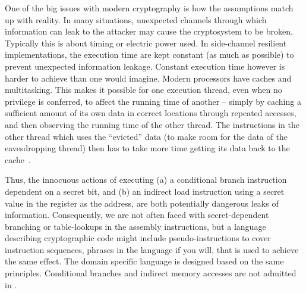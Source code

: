 
One of the big issues with modern cryptography is how the assumptions
match up with reality. In many situations, unexpected channels
through which information can leak to the attacker may cause the
cryptosystem to be broken. Typically this is about timing or
electric power used.
In side-channel resilient implementations, the execution time
are kept constant (as much as possible) to prevent unexpected
information leakage.
Constant execution time however is harder to achieve than one would imagine.
Modern processors have caches
and multitasking. This makes it possible for one execution
thread, even when no privilege is conferred, to affect the running
time of another -- simply by caching a sufficient amount of its own
data in correct locations through repeated accesses, and then
observing the running time of the other thread. The instructions in
the other thread which uses the ``evicted'' data (to make room for the
data of the eavesdropping thread) then has to take more time getting
its data back to the cache~\cite{B:05:CTAA}.



Thus, the innocuous actions of executing (a) a conditional
branch instruction dependent on a secret bit, and (b) an
indirect load instruction using a secret value in the register as the
address, are both potentially dangerous leaks of information.
Consequently, we are not often
faced with secret-dependent branching or table-lookups in the assembly
instructions, but a language describing cryptographic code might
include pseudo-instructions to cover instruction sequences, phrases in
the language if you will, that is used to achieve the same effect.
The domain specific language \bvdsl is designed based on the same
principles. Conditional branches and indirect memory accesses are not
admitted in \bvdsl.

